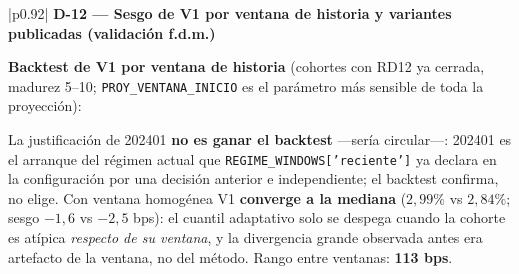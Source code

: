 \documentclass[12pt, a4paper]{article}
\newenvironment{recuadro}[1]
{\begin{center}\begin{tabular}{|p{0.92\textwidth}|}
\hline
\rowcolor{grissuave}
\textbf{#1} \\ \hline
}
{\\ \hline \end{tabular}\end{center}}
\begin{document}
\begin{recuadro}{D-12 --- Sesgo de V1 por ventana de historia y variantes publicadas (validación f.d.m.)}
{\footnotesize
{
\textbf{Backtest de V1 por ventana de historia} (cohortes con RD12 ya cerrada, madurez 5--10;
\texttt{PROY\_VENTANA\_INICIO} es el parámetro más sensible de toda la proyección):
\begin{center}
\end{center}
La justificación de 202401 \textbf{no es ganar el backtest} ---sería circular---: 202401 es el
arranque del régimen actual que \texttt{REGIME\_WINDOWS['reciente']} ya declara en la configuración
por una decisión anterior e independiente; el backtest confirma, no elige. Con ventana homogénea V1
\textbf{converge a la mediana} ($2{,}99\%$ vs $2{,}84\%$; sesgo $-1{,}6$ vs $-2{,}5$ bps): el
cuantil adaptativo solo se despega cuando la cohorte es atípica \emph{respecto de su ventana}, y la
divergencia grande observada antes era artefacto de la ventana, no del método. Rango entre ventanas:
\textbf{113 bps}.

}}
\end{recuadro}
\end{document}
